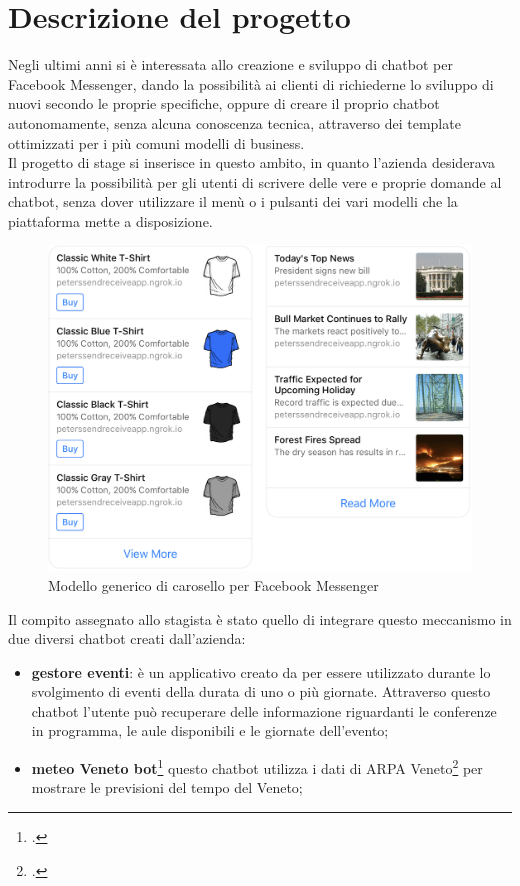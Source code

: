 \section{Descrizione del progetto}
Negli ultimi anni \azienda{} si è interessata allo creazione e sviluppo di \gls{chatbot} per Facebook Messenger, dando la possibilità ai clienti di richiederne lo sviluppo di nuovi secondo le proprie specifiche, oppure di creare il proprio \gls{chatbot} autonomamente, senza alcuna conoscenza tecnica, attraverso dei template ottimizzati per i più comuni modelli di business.\\
Il progetto di stage si inserisce in questo ambito, in quanto l'azienda desiderava introdurre la possibilità per gli utenti di scrivere delle vere e proprie domande al \gls{chatbot}, senza dover utilizzare il menù o i pulsanti dei vari modelli che la piattaforma mette a disposizione.
\begin{figure}[h]
	\centering
	\includegraphics[scale=0.2]{../Immagini/modello_lista.png}
	\caption{Modello generico di carosello per Facebook Messenger}
\end{figure}
\newpage
Il compito assegnato allo stagista è stato quello di integrare questo meccanismo in due diversi \gls{chatbot} creati dall'azienda:
\begin{itemize}
	\item \textbf{gestore eventi}: è un applicativo creato da \azienda{} per essere utilizzato durante lo svolgimento di eventi della durata di uno o più giornate. Attraverso questo \gls{chatbot} l'utente può recuperare delle informazione riguardanti le conferenze in programma, le aule disponibili e le giornate dell'evento;
	\item \textbf{meteo Veneto bot}\footcite{meteo} questo \gls{chatbot} utilizza i dati di ARPA Veneto\footcite{arpav} per mostrare le previsioni del tempo del Veneto;
\end{itemize}
